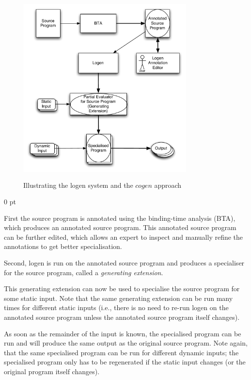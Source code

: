 \documentclass{sig-alternate}
\newenvironment{zitemize}%
   {\begin{list}{--}{
   \setlength{\itemsep}{0 pt}
   \setlength{\parsep}{0 pt}
   \setlength{\topsep} {0 pt} }}%
   {\end{list}}
\begin{document}
  
\begin{figure}[htb]
\begin{center}
\includegraphics[width=3.5in]{logen}
\end{center}
\caption{Illustrating the {\sc logen} system and the $\mathit{cogen}$ approach}
\protect\label{figure:logen}
\end{figure}




\begin{zitemize}
\item First the source program is annotated using the binding-time analysis
 (BTA), which
  produces an annotated source program.  This annotated source program
  can be further edited, which
  allows an expert to inspect and manually refine the annotations
  to get better specialisation. 
  
\item Second, {\sc logen} is run on the annotated source program and
  produces a specialiser for the source program, called a {\em
    generating extension}.
   
\item This generating extension can now be used to specialise the
  source program for some static input. Note that the same generating
  extension can be run many times for different static inputs (i.e.,
  there is no need to re-run {\sc logen} on the annotated source
  program unless the annotated source program itself changes).
    
\item As soon as the remainder of the input is known, the specialised
  program can be run and will produce the same output as the
  original source program.  Note again, that the same specialised
  program can be run for different dynamic inputs;  the specialised program 
  only has to be regenerated if the static input changes (or
  the original program itself changes).
 \end{zitemize}
\end{document}

